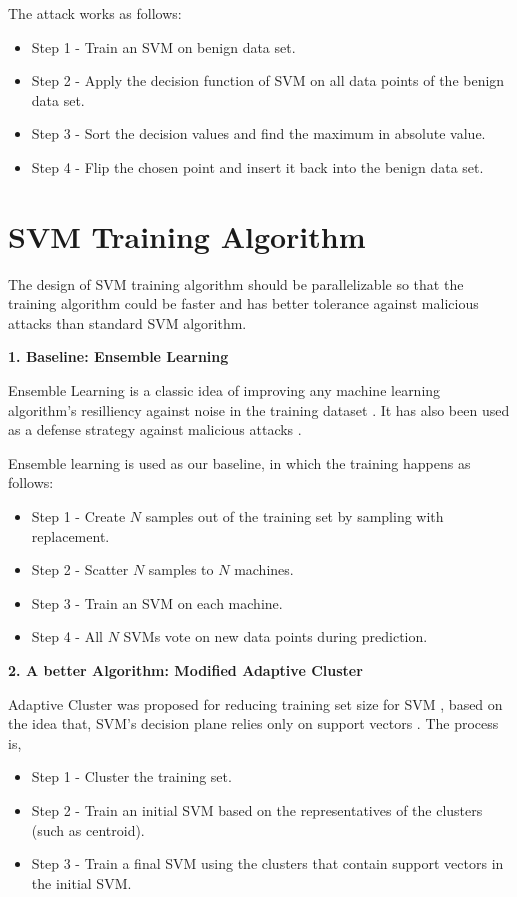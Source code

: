 \documentclass[10pt,conference,compsocconf,letterpaper]{IEEEtran}
\begin{document}
The attack works as follows:

\begin{itemize}
\item Step 1 - Train an SVM on benign data set.
\item Step 2 - Apply the decision function of SVM on all data points of the benign data set.
\item Step 3 - Sort the decision values and find the maximum in absolute value.
\item Step 4 - Flip the chosen point and insert it back into the benign data set.
\end{itemize}

\section{SVM Training Algorithm}

The design of SVM training algorithm should be parallelizable so that the training algorithm could be faster and has better tolerance against malicious attacks than standard SVM algorithm.

\textbf{1. Baseline: Ensemble Learning}

Ensemble Learning is a classic idea of improving any machine learning algorithm's resilliency against noise in the training dataset \cite{leo96, dong05}. It has also been used as a defense strategy against malicious attacks \cite{marco08, gabriela08}. 

Ensemble learning is used as our baseline, in which the training happens as follows:

\begin{itemize}
\item Step 1 - Create $N$ samples out of the training set by sampling with replacement.
\item Step 2 - Scatter $N$ samples to $N$ machines.
\item Step 3 - Train an SVM on each machine.
\item Step 4 - All $N$ SVMs vote on new data points during prediction.
\end{itemize}

\textbf{2. A better Algorithm: Modified Adaptive Cluster}

Adaptive Cluster was proposed for reducing training set size for SVM \cite{boley04, hwanjo03}, based on the idea that, SVM's decision plane relies only on support vectors \cite{koggalage04}. The process is, 

\begin{itemize}
\item Step 1 - Cluster the training set.
\item Step 2 - Train an initial SVM based on the representatives of the clusters (such as centroid).
\item Step 3 - Train a final SVM using the clusters that contain support vectors in the initial SVM.
\end{itemize}
\end{document}
